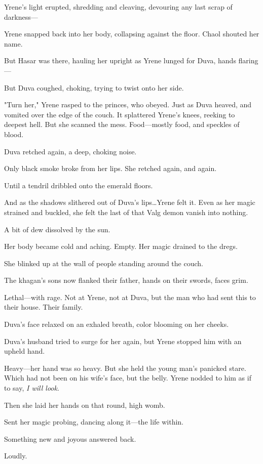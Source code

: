 Yrene's light erupted, shredding and cleaving, devouring any last scrap of darkness---

Yrene snapped back into her body, collapsing against the floor.
Chaol shouted her name.

But Hasar was there, hauling her upright as Yrene lunged for Duva, hands flaring---

But Duva coughed, choking, trying to twist onto her side.

"Turn her," Yrene rasped to the princes, who obeyed.
Just as Duva heaved, and vomited over the edge of the couch.
It splattered Yrene's knees, reeking to deepest hell.
But she scanned the mess.
Food---mostly food, and speckles of blood.

Duva retched again, a deep, choking noise.

Only black smoke broke from her lips.
She retched again, and again.

Until a tendril dribbled onto the emerald floors.

And as the shadows slithered out of Duva's lips\ldots Yrene felt it.
Even as her magic strained and buckled, she felt the last of that Valg demon vanish into nothing.

A bit of dew dissolved by the sun.

Her body became cold and aching.
Empty.
Her magic drained to the dregs.

She blinked up at the wall of people standing around the couch.

The khagan's sons now flanked their father, hands on their swords, faces grim.

Lethal---with rage.
Not at Yrene, not at Duva, but the man who had sent this to their house.
Their family.

Duva's face relaxed on an exhaled breath, color blooming on her cheeks.

Duva's husband tried to surge for her again, but Yrene stopped him with an upheld hand.

Heavy---her hand was so heavy.
But she held the young man's panicked stare.
Which had not been on his wife's face, but the belly.
Yrene nodded to him as if to say, \emph{I will look}.

Then she laid her hands on that round, high womb.

Sent her magic probing, dancing along it---the life within.

Something new and joyous answered back.

Loudly.

